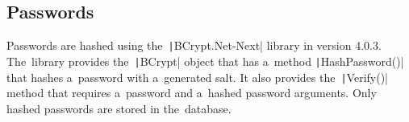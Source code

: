 \subsection{Passwords}

Passwords are hashed using the~\texttt|BCrypt.Net-Next| library in version 4.0.3.
The~library provides the~\texttt|BCrypt| object that has a~method \texttt|HashPassword()| that hashes a~password with a~generated salt.
It also provides the~\texttt|Verify()| method that requires a~password and a~hashed password arguments. 
\linebreak
Only hashed passwords are stored in the~database.
